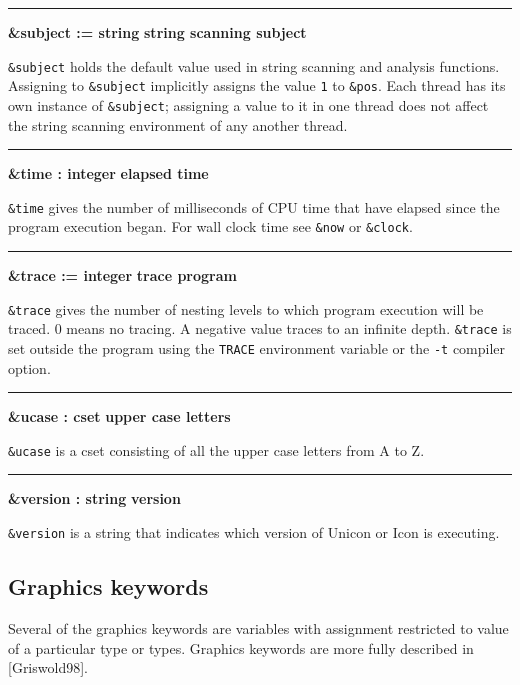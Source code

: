 \bigskip\hrule\vspace{0.1cm}
\noindent
{\bf \&subject := string } \hfill {\bf string scanning subject}

\noindent
{}\texttt{\&subject} holds the default
value used in string scanning and analysis functions. Assigning to
\texttt{\&subject} implicitly assigns the value \texttt{1} to
\texttt{\&pos}.
Each thread has its own instance of 
\texttt{\&subject}; \ConcurrencyIssue assigning a value to it in one
thread does not affect the string scanning environment of any another thread.

\bigskip\hrule\vspace{0.1cm}
\noindent
{\bf \&time : integer } \hfill {\bf elapsed time}

\noindent
{}\texttt{\&}\texttt{time}
gives the number of milliseconds of CPU time that have elapsed since
the program execution began. For wall clock time see \texttt{\&now} or
\texttt{\&clock}.

\bigskip\hrule\vspace{0.1cm}
\noindent
{\bf \&trace := integer } \hfill {\bf trace program}

\noindent
\texttt{\&trace} gives the number of nesting levels to which
program execution will be traced. 0 means no tracing.
A negative value traces to an infinite depth.
\texttt{\&trace} is set outside the program using the \texttt{TRACE}
environment variable or the
\texttt{{}-t} compiler option.

\bigskip\hrule\vspace{0.1cm}
\noindent
{\bf \&ucase : cset } \hfill {\bf upper case letters}

\noindent
{}\texttt{\&ucase} is a cset consisting of all the upper
case letters from A to Z.

\bigskip\hrule\vspace{0.1cm}
\noindent
{\bf \&version : string } \hfill {\bf version}

\noindent
{}\texttt{\&version} is a string that indicates which
version of Unicon or Icon is executing.

\subsection*{Graphics keywords}

Several of the graphics keywords are variables with assignment
restricted to value of a particular type or types. Graphics keywords
are more fully described in [Griswold98].

